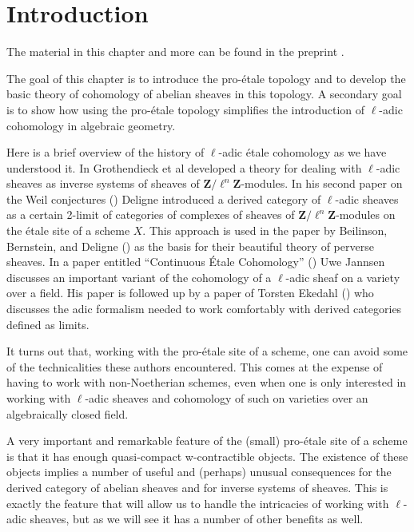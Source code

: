 \section{Introduction}
\label{proetale-section-introduction}
The material in this chapter and more can be found in the preprint \cite{BS}.

\medskip\noindent
The goal of this chapter is to introduce the pro-\'etale topology and to
develop the basic theory of cohomology of abelian sheaves in this topology.
A secondary goal is to show how using the pro-\'etale topology simplifies
the introduction of $\ell$-adic cohomology in algebraic geometry.

\medskip\noindent
Here is a brief overview of the history of $\ell$-adic \'etale cohomology
as we have understood it.
In \cite[Expos\'es V and VI]{SGA5} Grothendieck et al developed a theory for
dealing with $\ell$-adic sheaves as inverse systems of sheaves of
$\mathbf{Z}/\ell^n\mathbf{Z}$-modules.
In his second paper on the Weil conjectures (\cite{WeilII}) Deligne introduced
a derived category of $\ell$-adic sheaves as a certain 2-limit of categories
of complexes of sheaves of $\mathbf{Z}/\ell^n\mathbf{Z}$-modules on the
\'etale site of a scheme $X$. This approach is used in the paper by
Beilinson, Bernstein, and Deligne (\cite{BBD}) as the basis for their
beautiful theory of perverse sheaves. In a paper entitled ``Continuous
\'Etale Cohomology'' (\cite{Jannsen}) Uwe Jannsen discusses an important
variant of the cohomology of a $\ell$-adic sheaf on a variety over a field.
His paper is followed up by a paper of Torsten Ekedahl (\cite{Ekedahl})
who discusses the adic formalism needed to work comfortably with derived
categories defined as limits.

\medskip\noindent
It turns out that, working with the pro-\'etale site of a scheme,
one can avoid some of the technicalities these authors encountered.
This comes at the expense of having to work with non-Noetherian schemes,
even when one is only interested in working with $\ell$-adic sheaves
and cohomology of such on varieties over an algebraically closed field.

\medskip\noindent
A very important and remarkable feature of the
(small) pro-\'etale site of a scheme is
that it has enough quasi-compact w-contractible objects. The existence
of these objects implies
a number of useful and (perhaps) unusual consequences for the derived category
of abelian sheaves and for inverse systems of sheaves.
This is exactly the feature that will allow us to handle
the intricacies of working with $\ell$-adic sheaves, but as we
will see it has a number of other benefits as well.

